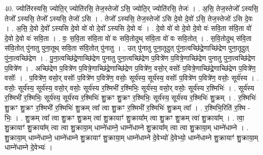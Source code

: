 \documentclass[17pt]{extarticle}
\begin{document}
40. ज्योति॑रस्यसि॒ ज्योति॒र् ज्योति॑रसि॒ तेज॒स्तेजो॑ ऽसि॒ ज्योति॒र् ज्योति॑रसि॒ तेजः॑ । . अ॒सि॒ तेज॒स्तेजो᳚ ऽस्यसि॒ तेजो᳚ ऽस्यसि॒ तेजो᳚ ऽस्यसि॒ तेजो॑ ऽसि । . तेजो᳚ ऽस्यसि॒ तेज॒स्तेजो॑ ऽसि दे॒वो दे॒वो॑ ऽसि॒ तेज॒स्तेजो॑ ऽसि दे॒वः । . अ॒सि॒ दे॒वो दे॒वो᳚ ऽस्यसि दे॒वो वो॑ वो दे॒वो᳚ ऽस्यसि दे॒वो वः॑ । . दे॒वो वो॑ वो दे॒वो दे॒वो वः॑ सवि॒ता स॑वि॒ता वो॑ दे॒वो दे॒वो वः॑ सवि॒ता । . वः॒ स॒वि॒ता स॑वि॒ता वो॑ वः सवि॒तोदुथ् स॑वि॒ता वो॑ वः सवि॒तोत् । . स॒वि॒तोदुथ् स॑वि॒ता स॑वि॒तोत् पु॑नातु पुना॒तूथ् सवि॒ता स॑वि॒तोत् पु॑नातु । . उत् पु॑नातु पुना॒तूदुत् पु॑ना॒त्वच्छि॑द्रे॒णाच्छि॑द्रेण पुना॒तूदुत् पु॑ना॒त्वच्छि॑द्रेण । . पु॒ना॒त्वच्छि॑द्रे॒णाच्छि॑द्रेण पुनातु पुना॒त्वच्छि॑द्रेण प॒वित्रे॑ण प॒वित्रे॒णाच्छि॑द्रेण पुनातु पुना॒त्वच्छि॑द्रेण प॒वित्रे॑ण । . अच्छि॑द्रेण प॒वित्रे॑ण प॒वित्रे॒णाच्छि॑द्रे॒णाच्छि॑द्रेण प॒वित्रे॑ण॒ वसो॒र् वसोः᳚ प॒वित्रे॒णाच्छि॑द्रे॒णाच्छि॑द्रेण प॒वित्रे॑ण॒ वसोः᳚ । . प॒वित्रे॑ण॒ वसो॒र् वसोः᳚ प॒वित्रे॑ण प॒वित्रे॑ण॒ वसोः॒ सूर्य॑स्य॒ सूर्य॑स्य॒ वसोः᳚ प॒वित्रे॑ण प॒वित्रे॑ण॒ वसोः॒ सूर्य॑स्य । . वसोः॒ सूर्य॑स्य॒ सूर्य॑स्य॒ वसो॒र् वसोः॒ सूर्य॑स्य र॒श्मिभी॑ र॒श्मिभिः॒ सूर्य॑स्य॒ वसो॒र् वसोः॒ सूर्य॑स्य र॒श्मिभिः॑ । . सूर्य॑स्य र॒श्मिभी॑ र॒श्मिभिः॒ सूर्य॑स्य॒ सूर्य॑स्य र॒श्मिभिः॑ शु॒क्रꣳ शु॒क्रꣳ र॒श्मिभिः॒ सूर्य॑स्य॒ सूर्य॑स्य र॒श्मिभिः॑ शु॒क्रम् । . र॒श्मिभिः॑ शु॒क्रꣳ शु॒क्रꣳ र॒श्मिभी॑ र॒श्मिभिः॑ शु॒क्रम् त्वा᳚ त्वा शु॒क्रꣳ र॒श्मिभी॑ र॒श्मिभिः॑ शु॒क्रम् त्वा᳚ । . र॒श्मिभि॒रिति॑ र॒श्मि - भिः॒ । . शु॒क्रम् त्वा᳚ त्वा शु॒क्रꣳ शु॒क्रम् त्वा॑ शु॒क्रायाꣳ॑ शु॒क्राया᳚म् त्वा शु॒क्रꣳ शु॒क्रम् त्वा॑ शु॒क्राया᳚म् । . त्वा॒ शु॒क्रायाꣳ॑ शु॒क्राया᳚म् त्वा त्वा शु॒क्राया॒म् धाम्ने॑धाम्ने॒ धाम्ने॑धाम्ने शु॒क्राया᳚म् त्वा त्वा शु॒क्राया॒म् धाम्ने॑धाम्ने । . शु॒क्राया॒म् धाम्ने॑धाम्ने॒ धाम्ने॑धाम्ने शु॒क्रायाꣳ॑ शु॒क्राया॒म् धाम्ने॑धाम्ने दे॒वेभ्यो॑ दे॒वेभ्यो॒ धाम्ने॑धाम्ने शु॒क्रायाꣳ॑ शु॒क्राया॒म् धाम्ने॑धाम्ने दे॒वेभ्यः॑ । \newline
\end{document}
